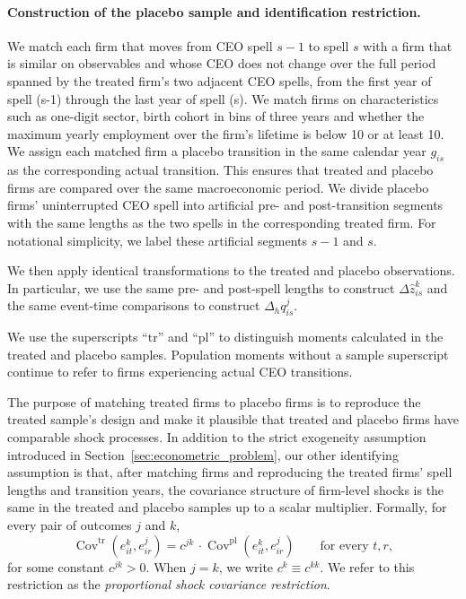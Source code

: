 \documentclass[sigconf,nonacm]{acmart}
\begin{document}
\paragraph{Construction of the placebo sample and identification restriction.}
We match each firm that moves from CEO spell $s-1$ to spell $s$ with a firm that is similar on observables and whose CEO does not change over the full period spanned by the treated firm's two adjacent CEO spells, from the first year of spell (s-1) through the last year of spell (s). We match firms on characteristics such as one-digit sector, birth cohort in bins of three years and whether the maximum yearly employment over the firm's lifetime is below 10 or at least 10. We assign each matched firm a placebo transition in the same calendar year $g_{is}$ as the corresponding actual transition. This ensures that treated and placebo firms are compared over the same macroeconomic period. We divide placebo firms' uninterrupted CEO spell into artificial pre- and post-transition segments with the same lengths as the two spells in the corresponding treated firm. For notational simplicity, we label
these artificial segments $s-1$ and $s$.

{\setlength{\emergencystretch}{1em}
We then apply identical transformations to the treated and placebo observations. In particular, we use the same pre- and post-spell lengths to construct $\Delta\widehat z_{is}^k$ and the same event-time comparisons to construct $\Delta_h q_{is}^j$. 
\par}

We use the superscripts ``$\mathrm{tr}$'' and ``$\mathrm{pl}$'' to distinguish
moments calculated in the treated and placebo samples. Population
moments without a sample superscript continue to refer to firms
experiencing actual CEO transitions.

The purpose of matching treated firms to placebo firms is to
reproduce the treated sample's design and make it plausible that
treated and placebo firms have comparable shock processes. In addition to the strict exogeneity assumption introduced
in Section~\ref{sec:econometric_problem}, our other identifying assumption is that, after matching firms and
reproducing the treated firms' spell lengths and transition years, the
covariance structure of firm-level shocks is the same in the treated
and placebo samples up to a scalar multiplier. Formally, for every pair of outcomes $j$
and $k$,
\begin{equation}
\operatorname{Cov}^{\mathrm{tr}}\!\left(
e_{it}^{k},e_{ir}^{j}
\right)
=
c^{jk}\, \cdot
\operatorname{Cov}^{\mathrm{pl}}\!\left(
e_{it}^{k},e_{ir}^{j}
\right)
\qquad
\text{for every }t,r,
\label{eq:proportional_shock_covariance}
\end{equation}
for some constant $c^{jk}>0$.
When $j=k$, we write $c^k \equiv c^{kk}$.
We refer to this restriction as the
\emph{proportional shock covariance restriction}.
\end{document}
